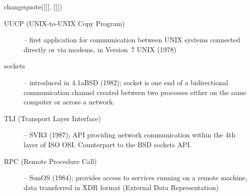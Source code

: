 
changequote([[[, ]]])

\pagebreak
{}

\begin{slide}
\end{slide}


\label{NETWORKING}

\begin{slide}
\begin{description}
\item[UUCP (UNIX-to-UNIX Copy Program)] -- first application for communication
between UNIX systems connected directly or via modems, in Version~7 UNIX (1978)
\item[sockets] -- introduced in 4.1aBSD (1982); socket is one end of a
bidirectional communication channel created between two processes either on the
same computer or across a network.
\item[TLI (Transport Layer Interface)] -- SVR3 (1987); API providing network
communication within the 4th layer of ISO OSI.  Counterpart to the BSD sockets
API.
\item[RPC (Remote Procedure Call)] -- SunOS (1984); provides access to services
running on a remote machine, data transferred in XDR format (External Data
Representation)
\end{description}
\end{slide}

